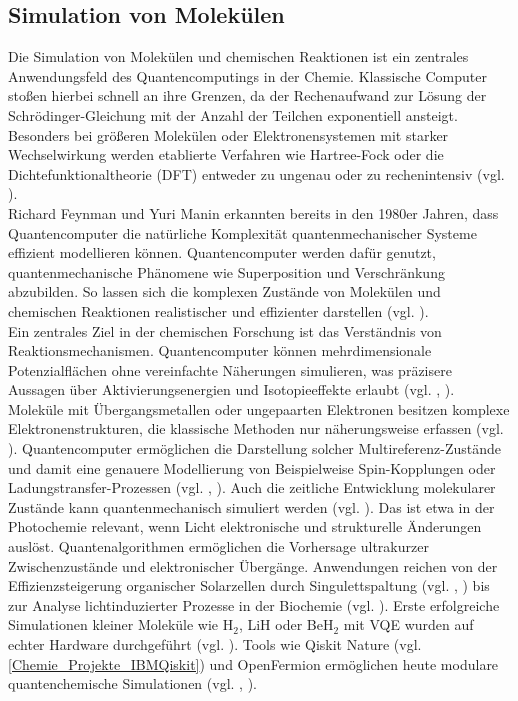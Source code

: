 \subsection{Simulation von Molekülen}
\label{Chemie_Simulation_Moleküle}
{Die Simulation von Molekülen und chemischen Reaktionen ist ein zentrales Anwendungsfeld des Quantencomputings in der Chemie. Klassische Computer stoßen hierbei schnell an ihre Grenzen, da der Rechenaufwand zur Lösung der Schrödinger-Gleichung mit der Anzahl der Teilchen exponentiell ansteigt. Besonders bei größeren Molekülen oder Elektronensystemen mit starker Wechselwirkung werden etablierte Verfahren wie Hartree-Fock oder die Dichtefunktionaltheorie (DFT) entweder zu ungenau oder zu rechenintensiv (vgl. \cite{bauer_quantum_2020}).}
\newline\\
{Richard Feynman und Yuri Manin erkannten bereits in den 1980er Jahren, dass Quantencomputer die natürliche Komplexität quantenmechanischer Systeme effizient modellieren können. Quantencomputer werden dafür genutzt, quantenmechanische Phänomene wie Superposition und Verschränkung abzubilden. So lassen sich die komplexen Zustände von Molekülen und chemischen Reaktionen realistischer und effizienter darstellen (vgl. \cite{feynmanSimulatingPhysicsComputers1982}).}
\newline\\
Ein zentrales Ziel in der chemischen Forschung ist das Verständnis von Reaktionsmechanismen. Quantencomputer können mehrdimensionale Potenzialflächen ohne vereinfachte Näherungen simulieren, was präzisere Aussagen über Aktivierungsenergien und Isotopieeffekte erlaubt (vgl. \cite{liu_quantum_2020}, \cite{mcardle_quantum_2020}). Moleküle mit Übergangsmetallen oder ungepaarten Elektronen besitzen komplexe Elektronenstrukturen, die klassische Methoden nur näherungsweise erfassen (vgl. \cite{weidman_quantum_2024}). Quantencomputer ermöglichen die Darstellung solcher Multireferenz-Zustände und damit eine genauere Modellierung von Beispielweise Spin-Kopplungen oder Ladungstransfer-Prozessen (vgl. \cite{bauer_quantum_2020}, \cite{mcardle_quantum_2020}). Auch die zeitliche Entwicklung molekularer Zustände kann quantenmechanisch simuliert werden (vgl. \cite{bauer_quantum_2020}). Das ist etwa in der Photochemie relevant, wenn Licht elektronische und strukturelle Änderungen auslöst. Quantenalgorithmen ermöglichen die Vorhersage ultrakurzer Zwischenzustände und elektronischer Übergänge. Anwendungen reichen von der Effizienzsteigerung organischer Solarzellen durch Singulettspaltung (vgl. \cite{motlagh_quantum_2025}, \cite{baldacchino_singlet_2022}) bis zur Analyse lichtinduzierter Prozesse in der Biochemie (vgl. \cite{macdonell_predicting_2023}). Erste erfolgreiche Simulationen kleiner Moleküle wie H$_2$, LiH oder BeH$_2$ mit VQE wurden auf echter Hardware durchgeführt (vgl. \cite{kandala_hardware-efficient_2017}). Tools wie Qiskit Nature (vgl.  \ref{Chemie_Projekte_IBMQiskit}) und OpenFermion ermöglichen heute modulare quantenchemische Simulationen (vgl. \cite{the_qiskit_nature_development_team_qiskit_2023}, \cite{mcardle_quantum_2020}).


